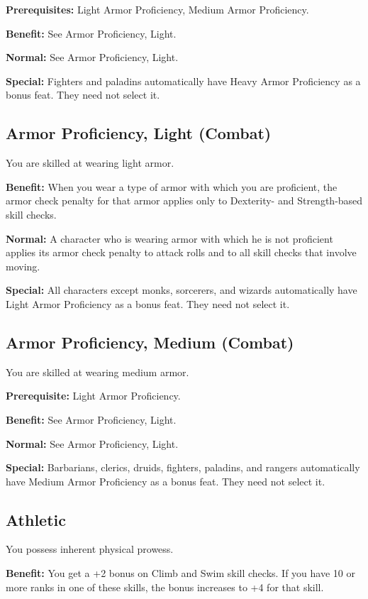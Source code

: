 \textbf{Prerequisites:} Light Armor Proficiency, Medium Armor Proficiency.
				
\textbf{Benefit:} See Armor Proficiency, Light.
				
\textbf{Normal:} See Armor Proficiency, Light.
				
\textbf{Special:} Fighters and paladins automatically have Heavy Armor Proficiency as a bonus feat. They need not select it.
				
\subsection{Armor Proficiency, Light (Combat)}

				
You are skilled at wearing light armor.
				
\textbf{Benefit:} When you wear a type of armor with which you are proficient, the armor check penalty for that armor applies only to Dexterity- and Strength-based skill checks.
				
\textbf{Normal:} A character who is wearing armor with which he is not proficient applies its armor check penalty to attack rolls and to all skill checks that involve moving.
				
\textbf{Special:} All characters except monks, sorcerers, and wizards automatically have Light Armor Proficiency as a bonus feat. They need not select it.
				
\subsection{Armor Proficiency, Medium (Combat)}

				
You are skilled at wearing medium armor.
				
\textbf{Prerequisite:} Light Armor Proficiency.
				
\textbf{Benefit:} See Armor Proficiency, Light.
				
\textbf{Normal:} See Armor Proficiency, Light.
				
\textbf{Special:} Barbarians, clerics, druids, fighters, paladins, and rangers automatically have Medium Armor Proficiency as a bonus feat. They need not select it.
				
\subsection{Athletic}

				
You possess inherent physical prowess.
				
\textbf{Benefit:} You get a +2 bonus on Climb and Swim skill checks. If you have 10 or more ranks in one of these skills, the bonus increases to +4 for that skill.
				
